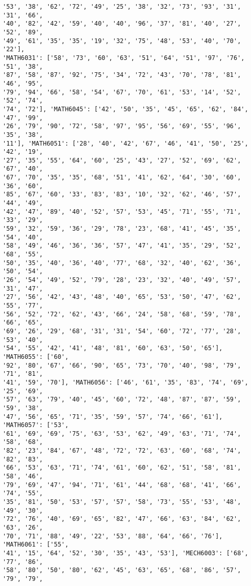 \documentclass[11pt]{article}
\begin{document}
\begin{Verbatim}[commandchars=\\\{\}]
'53', '38', '62', '72', '49', '25', '38', '32', '73', '93', '31', '31', '66',
'40', '82', '42', '59', '40', '40', '96', '37', '81', '40', '27', '52', '89',
'49', '61', '35', '35', '19', '32', '75', '48', '53', '40', '70', '22'],
'MATH6031': ['58', '73', '60', '63', '51', '64', '51', '97', '76', '51', '38',
'87', '58', '87', '92', '75', '34', '72', '43', '70', '78', '81', '46', '95',
'79', '94', '66', '58', '54', '67', '70', '61', '53', '14', '52', '52', '74',
'74', '72'], 'MATH6045': ['42', '50', '35', '45', '65', '62', '84', '47', '99',
'26', '79', '90', '72', '58', '97', '95', '56', '69', '55', '96', '35', '38',
'11'], 'MATH6051': ['28', '40', '42', '67', '46', '41', '50', '25', '42', '19',
'27', '35', '55', '64', '60', '25', '43', '27', '52', '69', '62', '67', '40',
'67', '70', '35', '35', '68', '51', '41', '62', '64', '30', '60', '36', '60',
'85', '67', '60', '33', '83', '83', '10', '32', '62', '46', '57', '44', '49',
'42', '47', '89', '40', '52', '57', '53', '45', '71', '55', '71', '33', '29',
'59', '32', '59', '36', '29', '78', '23', '68', '41', '45', '35', '54', '40',
'58', '49', '46', '36', '36', '57', '47', '41', '35', '29', '52', '68', '55',
'50', '35', '40', '36', '40', '77', '68', '32', '40', '62', '36', '50', '54',
'26', '54', '49', '52', '79', '28', '23', '32', '40', '49', '57', '31', '47',
'27', '56', '42', '43', '48', '40', '65', '53', '50', '47', '62', '55', '77',
'56', '52', '72', '62', '43', '66', '24', '58', '68', '59', '78', '66', '65',
'69', '26', '29', '68', '31', '31', '54', '60', '72', '77', '28', '53', '40',
'54', '55', '42', '41', '48', '81', '60', '63', '50', '65'], 'MATH6055': ['60',
'92', '80', '67', '66', '90', '65', '73', '70', '40', '98', '79', '71', '81',
'41', '59', '70'], 'MATH6056': ['46', '61', '35', '83', '74', '69', '25', '69',
'57', '63', '79', '40', '45', '60', '72', '48', '87', '87', '59', '59', '38',
'47', '56', '65', '71', '35', '59', '57', '74', '66', '61'], 'MATH6057': ['53',
'61', '69', '69', '75', '63', '53', '62', '49', '63', '71', '74', '58', '68',
'82', '23', '84', '67', '48', '72', '72', '63', '60', '68', '74', '82', '83',
'66', '53', '63', '71', '74', '61', '60', '62', '51', '58', '81', '58', '46',
'79', '69', '47', '94', '71', '61', '44', '68', '68', '41', '66', '74', '55',
'35', '81', '50', '53', '57', '57', '58', '73', '55', '53', '48', '49', '30',
'72', '76', '40', '69', '65', '82', '47', '66', '63', '84', '62', '63', '26',
'70', '71', '88', '49', '22', '53', '88', '64', '66', '76'], 'MATH6061': ['55',
'41', '15', '64', '52', '30', '35', '43', '53'], 'MECH6003': ['68', '77', '86',
'58', '80', '50', '80', '62', '45', '63', '65', '68', '86', '57', '79', '79',

\end{Verbatim}
\end{document}
